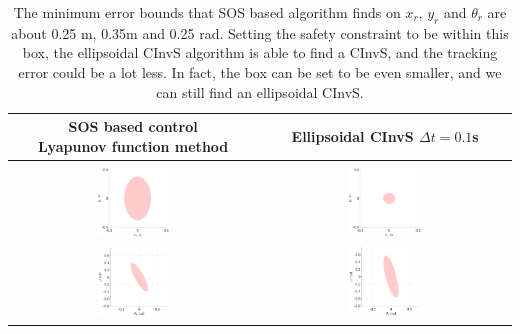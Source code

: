 \documentclass{article}
\begin{document}
\begin{table}[H]
	\centering
	\begin{tabular}{|c|c|}
		\hline
		\makecell{SOS based control\\Lyapunov function method \cite{sos-tracking}}  & \makecell{Ellipsoidal CInvS\\$\Delta t = 0.1$s}\\
		\hline
		& \\
		\includegraphics[width=0.3\textwidth]{5d/sos1.pdf} & \includegraphics[width=0.3\textwidth]{5d/ellipse1.pdf}\\
		\includegraphics[width=0.3\textwidth]{5d/sos2.pdf} & \includegraphics[width=0.3\textwidth]{5d/ellipse2.pdf}\\
		\hline
	\end{tabular}
	\caption{The minimum error bounds that SOS based algorithm finds on $x_r$, $y_r$ and $\theta_r$ are about 0.25 m, 0.35m and 0.25 rad. Setting the safety constraint to be within this box, the ellipsoidal CInvS algorithm is able to find a CInvS, and the tracking error could be a lot less. In fact, the box can be set to be even smaller, and we can still find an ellipsoidal CInvS.}
	\label{5d-compare}
\end{table}
\end{document}
